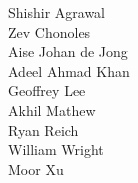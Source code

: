 Shishir Agrawal\\
Zev Chonoles\\
Aise Johan de Jong\\
Adeel Ahmad Khan\\
Geoffrey Lee\\
Akhil Mathew\\
Ryan Reich\\
William Wright\\
Moor Xu\\
